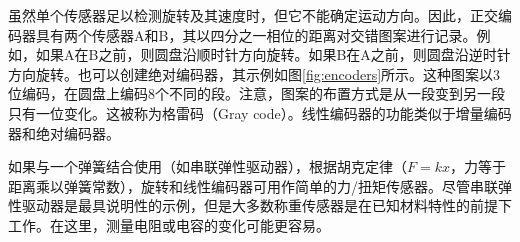 
虽然单个传感器足以检测旋转及其速度时，但它不能确定运动方向。因此，正交编码器具有两个传感器A和B，其以四分之一相位的距离对交错图案进行记录。例如，如果A在B之前，则圆盘沿顺时针方向旋转。如果B在A之前，则圆盘沿逆时针方向旋转。也可以创建绝对编码器，其示例如图\ref{fig:encoders}所示。这种图案以3位编码，在圆盘上编码8个不同的段。注意，图案的布置方式是从一段变到另一段只有一位变化。这被称为格雷码（Gray code）。线性编码器的功能类似于增量编码器和绝对编码器。


如果与一个弹簧结合使用（如串联弹性驱动器），根据胡克定律（$F=kx$，力等于距离乘以弹簧常数），旋转和线性编码器可用作简单的力/扭矩传感器。尽管串联弹性驱动器是最具说明性的示例，但是大多数称重传感器是在已知材料特性的前提下工作。在这里，测量电阻或电容的变化可能更容易。


